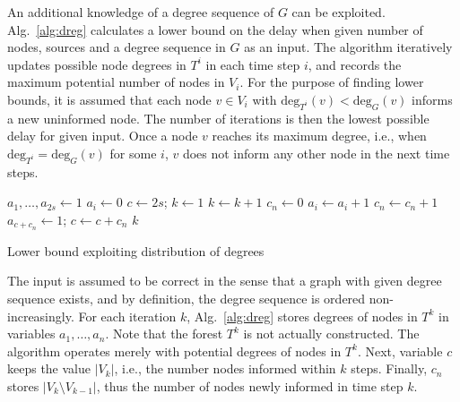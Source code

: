 An additional knowledge of a degree sequence of $G$ can be exploited. 
Alg.~\ref{alg:dreg} calculates a lower bound on the delay when given number of nodes, sources and a degree sequence in $G$ as an input.
The algorithm iteratively updates possible node degrees in $T^i$ in each time step $i$, and records the maximum potential number of nodes in $V_i$.
For the purpose of finding lower bounds, it is assumed that each node $v\in V_i$ with $\text{deg}_{T^i}(v)<\text{deg}_G(v)$ informs a new uninformed node.
The number of iterations is then the lowest possible delay for given input.
Once a node $v$ reaches its maximum degree, i.e., when $\text{deg}_{T^i}=\text{deg}_G(v)$ for some $i$, $v$ does not inform any other node in the next time steps.


\begin{algorithm}
$a_1,\dots,a_{2s}\leftarrow 1$\;%
 {
$a_i\leftarrow 0$\;
}
$c\leftarrow 2s$;
$k\leftarrow 1$\;
 {
$k\leftarrow k+1$\;
$c_n\leftarrow 0$\;
 {
	 {
		$a_i\leftarrow a_i + 1$\;
		$c_n\leftarrow c_n + 1$\;
		 {
			$a_{c+c_n}\leftarrow 1$; 
		}
	}
}
$c\leftarrow c + c_n$\;
}
\Return $k$\;
 \caption{Lower bound exploiting distribution of degrees}
\label{alg:dreg}
\end{algorithm}


The input is assumed to be correct in the sense that a graph with given degree sequence exists, and by definition, the degree sequence is ordered non-increasingly.
For each iteration $k$, Alg.~\ref{alg:dreg} stores degrees of nodes in $T^k$ in variables $a_1,\dots,a_n$.
Note that the forest $T^k$ is not actually constructed. 
The algorithm operates merely with potential degrees of nodes in $T^k$.
Next, variable $c$ keeps the value $|V_k|$, i.e., the number nodes informed within $k$ steps.
Finally, $c_n$ stores $|V_k\setminus V_{k-1}|$, thus the number of nodes newly informed in time step $k$.



